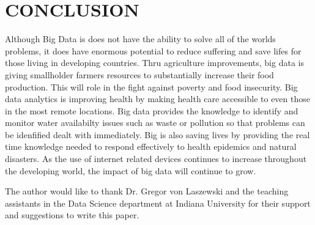 \documentclass[sigconf]{acmart}
\begin{document}
 





\section{CONCLUSION}


Although Big Data is does not have the ability to solve all of the worlds problems, it does have enormous potential to reduce suffering and save lifes for those living in developing countries. Thru agriculture improvements, big data is giving smallholder farmers resources to substantially increase their food production. This will role in the fight against poverty and food insecurity. Big data analytics is improving health by making health care accessible to even those in the most remote locations. Big data provides the knowledge to identify and monitor water availabilty issues such as waste or pollution so that problems can be idenfified dealt with immediately. Big is also saving lives by providing the real time knowledge needed to respond effectively to health epidemics and natural disasters. As the use of internet related devices continues to increase throughout the developing world, the impact of big data will continue to grow.   







\begin{acks}

  The author would like to thank Dr. Gregor von Laszewski and the teaching assistants in the Data Science department at Indiana  University for their support and suggestions to write this paper.

\end{acks}




 
\end{document}
